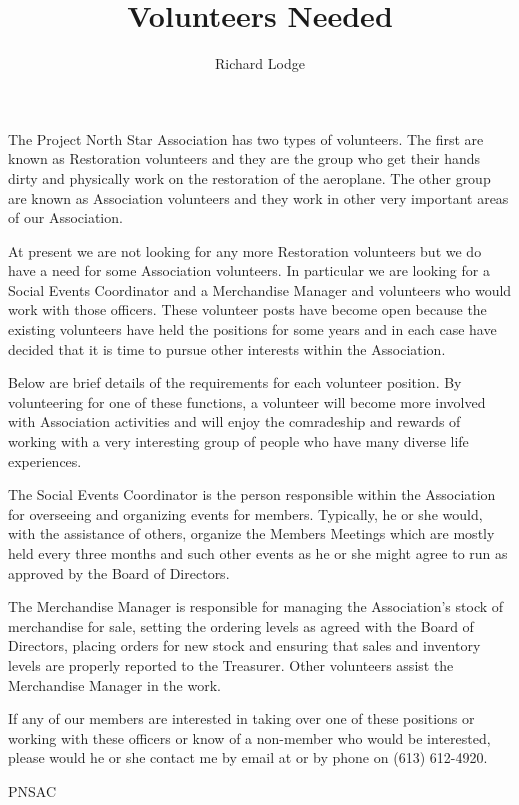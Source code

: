 %


\title{Volunteers Needed} \author{Richard Lodge}

\maketitle

The Project North Star Association has two types of volunteers. The
first are known as Restoration volunteers and they are the group who
get their hands dirty and physically work on the restoration of the
aeroplane. The other group are known as Association volunteers and
they work in other very important areas of our Association.

At present we are not looking for any more Restoration volunteers but
we do have a need for some Association volunteers. In particular we
are looking for a Social Events Coordinator and a Merchandise Manager
and volunteers who would work with those officers.  These volunteer
posts have become open because the existing volunteers have held the
positions for some years and in each case have decided that it is time
to pursue other interests within the Association.

Below are brief details of the requirements for each volunteer
position. By volunteering for one of these functions, a volunteer will
become more involved with Association activities and will enjoy the
comradeship and rewards of working with a very interesting group of
people who have many diverse life experiences.

The Social Events Coordinator is the person responsible within the
Association for overseeing and organizing events for
members. Typically, he or she would, with the assistance of others,
organize the Members Meetings which are mostly held every three months
and such other events as he or she might agree to run as approved by
the Board of Directors.

The Merchandise Manager is responsible for managing the Association's
stock of merchandise for sale, setting the ordering levels as agreed
with the Board of Directors, placing orders for new stock and ensuring
that sales and inventory levels are properly reported to the
Treasurer. Other volunteers assist the Merchandise Manager in the
work.

If any of our members are interested in taking over one of these
positions or working with these officers or know of a non-member who
would be interested, please would he or she contact me by email at
 or by phone on (613) 612-4920.

\begin{footnotesize} \raggedleft PNSAC\\
\end{footnotesize}




